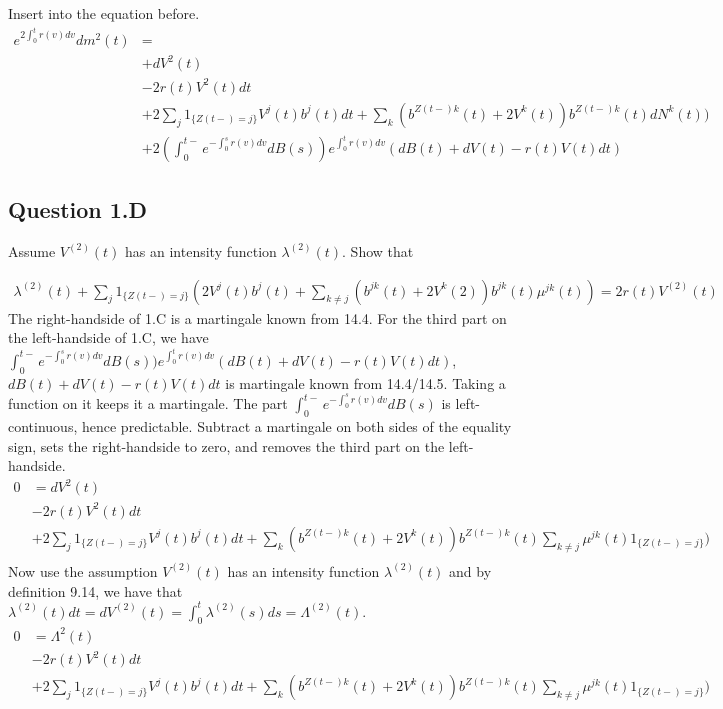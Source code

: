 \documentclass[10pt]{article}
\begin{document}
Insert into the equation before.
\begin{equation}
\begin{split}
e^{2\int_0^t r(v)dv}dm^2(t) & = \\
& + dV^2(t) \\
& - 2 r(t) V^2(t)dt \\
& + 2 \sum_j 1_{\{Z(t-)=j\}} V^j(t)b^{j}(t)dt + \sum_{k} (b^{Z(t-)k}(t) + 2V^k(t))b^{Z(t-)k}(t)dN^k(t)) \\
& + 2(\int_0^{t-} {e^{-\int_0^s {r(v) dv}}dB(s)}) e^{\int_0^t r(v)dv} (dB(t) + dV(t) - r(t)V(t)dt)
\end{split}
\end{equation}

\newpage

\subsection{Question 1.D}
Assume $V^{(2)}(t)$ has an intensity function $\lambda^{(2)}(t)$. Show that

\begin{equation}
\begin{split}
\lambda^{(2)}(t) + \sum_j 1_{\{Z(t-) = j\}}(2V^j(t)b^j(t) + \sum_{k \neq j}(b^{jk}(t) + 2V^k(2))b^{jk}(t)\mu^{jk}(t)) = 2r(t)V^{(2)}(t)
\end{split}
\end{equation}
The right-handside of 1.C is a martingale known from 14.4. For the third part on the left-handside of 1.C, we have $\int_0^{t-} {e^{-\int_0^s {r(v) dv}}dB(s)}) e^{\int_0^t r(v)dv} (dB(t) + dV(t) - r(t)V(t)dt)$, $dB(t) + dV(t) - r(t)V(t)dt$ is martingale known from 14.4/14.5. Taking a function on it keeps it a martingale. The part $\int_0^{t-} {e^{-\int_0^s {r(v) dv}}dB(s)} $ is left-continuous, hence predictable.  Subtract a martingale on both sides of the equality sign, sets the right-handside to zero, and removes the third part on the left-handside.
\begin{equation}
\begin{split}
0 & = dV^2(t) \\
& - 2 r(t) V^2(t)dt \\
& + 2 \sum_j 1_{\{Z(t-)=j\}} V^j(t)b^{j}(t)dt + \sum_{k} (b^{Z(t-)k}(t) + 2V^k(t))b^{Z(t-)k}(t)\sum_{k\neq j} \mu^{jk}(t)1_{\{Z(t-)=j\}}) \\
\end{split}
\end{equation}
Now use the assumption $V^{(2)}(t)$ has an intensity function $\lambda^{(2)}(t)$ and by definition 9.14, we have that $\lambda^{(2)}(t)dt = dV^{(2)}(t) = \int_0^t \lambda^{(2)}(s)ds = \Lambda^{(2)}(t)$.
\begin{equation}
\begin{split}
0 & = \Lambda^2(t) \\
& - 2 r(t) V^2(t)dt \\
& + 2 \sum_j 1_{\{Z(t-)=j\}} V^j(t)b^{j}(t)dt + \sum_{k} (b^{Z(t-)k}(t) + 2V^k(t))b^{Z(t-)k}(t)\sum_{k\neq j} \mu^{jk}(t)1_{\{Z(t-)=j\}}) \\
\end{split}
\end{equation}
\end{document}
